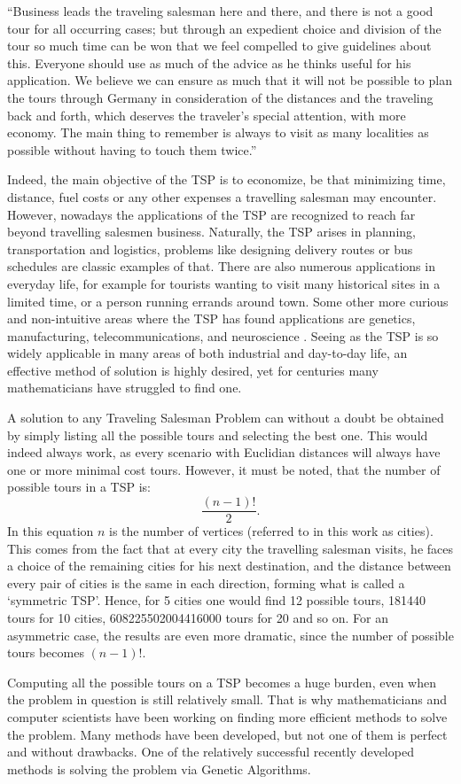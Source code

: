 \begin{displayquote} 
``Business leads the traveling salesman here and there, and there is not a good tour for all occurring cases; but through an expedient choice and division of the tour so much time can be won that we feel compelled to give guidelines about this. Everyone should use as much of the advice as he thinks useful for his application. We believe we can ensure as much that it will not be possible to plan the tours through Germany in consideration of the distances and the traveling back and forth, which deserves the traveler’s special attention, with more economy. The main thing to remember is always to visit as many localities as possible without having to touch them twice.'' \cite{tspbook}
\end{displayquote}
\par
Indeed, the main objective of the TSP is to economize, be that minimizing time, distance, fuel costs or any other expenses a travelling salesman may encounter. However, nowadays the applications of the TSP are recognized to reach far beyond travelling salesmen business. Naturally, the TSP arises in planning, transportation and logistics, problems like designing delivery routes or bus schedules are classic examples of that. There are also numerous applications in everyday life, for example for tourists wanting to visit many historical sites in a limited time, or a person running errands around town. Some other more curious and non-intuitive areas where the TSP has found applications are genetics, manufacturing, telecommunications, and neuroscience \cite{tspbook} \cite{ORlecture}.
Seeing as the TSP is so widely applicable in many areas of both industrial and day-to-day life, an effective method of solution is highly desired, yet for centuries many mathematicians have struggled to find one.
\par
A solution to any Traveling Salesman Problem can without a doubt be obtained by simply listing all the possible tours and selecting the best one. This would indeed always work, as every scenario with Euclidian distances will always have one or more minimal cost tours. However, it must be noted, that the number of possible tours in a TSP is: \[\frac{(n-1)!}{2}.\] \noindent In this equation $n$ is the number of vertices (referred to in this work as cities). This comes from the fact that at every city the travelling salesman visits, he faces a choice of the remaining cities for his next destination, and the distance between every pair of cities is the same in each direction, forming what is called a `symmetric TSP'. Hence, for 5 cities one would find 12 possible tours, 181440 tours for 10 cities, 608225502004416000 tours for 20 and so on. For an asymmetric case, the results are even more dramatic, since the number of possible tours becomes $(n-1)!$.
\par
Computing all the possible tours on a TSP becomes a huge burden, even when the problem in question is still relatively small. That is why mathematicians and computer scientists have been working on finding more efficient methods to solve the problem. Many methods have been developed, but not one of them is perfect and without drawbacks. One of the relatively successful recently developed methods is solving the problem via Genetic Algorithms.